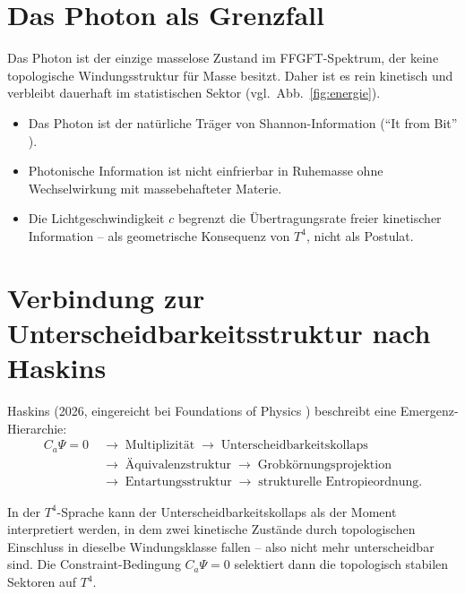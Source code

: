 \section{Das Photon als Grenzfall}

Das Photon ist der einzige masselose Zustand im FFGFT-Spektrum,
der keine topologische Windungsstruktur für Masse besitzt.
Daher ist es rein kinetisch und verbleibt dauerhaft im statistischen
Sektor (vgl.\ Abb.~\ref{fig:energie}).

\begin{itemize}
  \item Das Photon ist der natürliche Träger von Shannon-Information
        (\enquote{It from Bit} \cite{Wheeler1990}).
  \item Photonische Information ist nicht einfrierbar
        in Ruhemasse ohne Wechselwirkung mit massebehafteter Materie.
  \item Die Lichtgeschwindigkeit \(c\) begrenzt die
        Übertragungsrate freier kinetischer Information --
        als geometrische Konsequenz von \(T^4\), nicht als Postulat.
\end{itemize}

\section{Verbindung zur Unterscheidbarkeitsstruktur nach Haskins}

Haskins (2026, eingereicht bei Foundations of Physics \cite{Haskins2026})
beschreibt eine Emergenz-Hierarchie:
\begin{align*}
C_a\Psi = 0 \;&\to\; \text{Multiplizität} \;\to\;
\text{Unterscheidbarkeitskollaps} \\
&\to\; \text{Äquivalenzstruktur} \;\to\;
\text{Grobkörnungsprojektion} \\
&\to\; \text{Entartungsstruktur} \;\to\;
\text{strukturelle Entropieordnung.}
\end{align*}

In der \(T^4\)-Sprache kann der Unterscheidbarkeitskollaps als
der Moment interpretiert werden, in dem zwei kinetische Zustände durch
topologischen Einschluss in dieselbe Windungsklasse fallen --
also nicht mehr unterscheidbar sind.
Die Constraint-Bedingung \(C_a\Psi = 0\) selektiert dann die
topologisch stabilen Sektoren auf \(T^4\).

